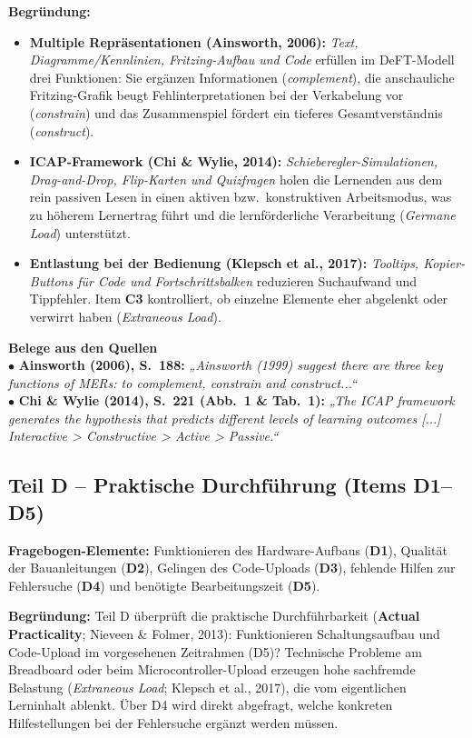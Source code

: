 \documentclass[a4paper,10pt]{article}
\newcommand{\quotebox}[2]{%
  \begin{tcolorbox}[
    colback=lightgray,
    colframe=accent,
    arc=1.5mm,
    boxrule=0pt,
    leftrule=3pt,
    top=5pt, bottom=5pt, left=8pt, right=8pt
  ]
  {\small \textbf{\color{primary} #1}\\[2pt]
  #2}
  \end{tcolorbox}
}
\begin{document}
\textbf{Begründung:}
\begin{itemize}[leftmargin=1.5em, itemsep=1pt, topsep=1pt]
  \item \textbf{Multiple Repräsentationen (Ainsworth, 2006):} \textit{Text, Diagramme/Kennlinien, Fritzing-Aufbau und Code} erfüllen im DeFT-Modell drei Funktionen: Sie ergänzen Informationen (\textit{complement}), die anschauliche Fritzing-Grafik beugt Fehlinterpretationen bei der Verkabelung vor (\textit{constrain}) und das Zusammenspiel fördert ein tieferes Gesamtverständnis (\textit{construct}).
  \item \textbf{ICAP-Framework (Chi \& Wylie, 2014):} \textit{Schieberegler-Simulationen, Drag-and-Drop, Flip-Karten und Quizfragen} holen die Lernenden aus dem rein passiven Lesen in einen aktiven bzw.\ konstruktiven Arbeitsmodus, was zu höherem Lernertrag führt und die lernförderliche Verarbeitung (\textit{Germane Load}) unterstützt.
  \item \textbf{Entlastung bei der Bedienung (Klepsch et al., 2017):} \textit{Tooltips, Kopier-Buttons für Code und Fortschrittsbalken} reduzieren Suchaufwand und Tippfehler. Item \textbf{C3} kontrolliert, ob einzelne Elemente eher abgelenkt oder verwirrt haben (\textit{Extraneous Load}).
\end{itemize}

\quotebox{Belege aus den Quellen}{
$\bullet$ \textbf{Ainsworth (2006), S.~188:} \textit{„Ainsworth (1999) suggest there are three key functions of MERs: to complement, constrain and construct...“}\\[3pt]
$\bullet$ \textbf{Chi \& Wylie (2014), S.~221 (Abb.~1 \& Tab.~1):} \textit{„The ICAP framework generates the hypothesis that predicts different levels of learning outcomes [...] Interactive > Constructive > Active > Passive.“}
}

\subsection*{\color{primary} Teil D – Praktische Durchführung (Items D1–D5)}
\textbf{Fragebogen-Elemente:} Funktionieren des Hardware-Aufbaus (\textbf{D1}), Qualität der Bauanleitungen (\textbf{D2}), Gelingen des Code-Uploads (\textbf{D3}), fehlende Hilfen zur Fehlersuche (\textbf{D4}) und benötigte Bearbeitungszeit (\textbf{D5}).

\textbf{Begründung:} Teil D überprüft die praktische Durchführbarkeit (\textbf{Actual Practicality}; Nieveen \& Folmer, 2013): Funktionieren Schaltungsaufbau und Code-Upload im vorgesehenen Zeitrahmen (D5)? Technische Probleme am Breadboard oder beim Microcontroller-Upload erzeugen hohe sachfremde Belastung (\textit{Extraneous Load}; Klepsch et al., 2017), die vom eigentlichen Lerninhalt ablenkt. Über D4 wird direkt abgefragt, welche konkreten Hilfestellungen bei der Fehlersuche ergänzt werden müssen.
\end{document}
